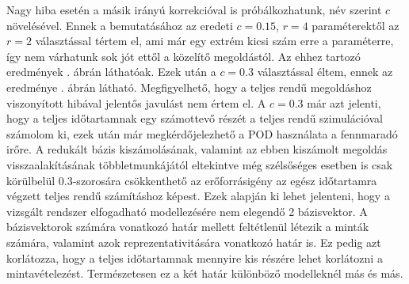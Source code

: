         \par
        Nagy hiba esetén a másik irányú korrekcióval is próbálkozhatunk, név szerint $c$ növelésével. Ennek a bemutatásához az eredeti $c=0.15$, $r=4$ paraméterektől az $r=2$ választással tértem el, ami már egy extrém kicsi szám erre a paraméterre, így nem várhatunk sok jót ettől a közelítő megoldástól. Az ehhez tartozó eredmények . ábrán láthatóak. Ezek után a $c=0.3$ választással éltem, ennek az eredménye . ábrán látható. Megfigyelhető, hogy a teljes rendű megoldáshoz viszonyított hibával jelentős javulást nem értem el. A $c=0.3$ már azt jelenti, hogy a teljes időtartamnak egy számottevő részét a teljes rendű szimulációval számolom ki, ezek után már megkérdőjelezhető a POD használata a fennmaradó irőre. A redukált bázis kiszámolásának, valamint az ebben kiszámolt megoldás visszaalakításának többletmunkájától eltekintve még szélsőséges esetben is csak körülbelül $0.3$-szorosára csökkenthető az erőforrásigény az egész időtartamra végzett teljes rendű számításhoz képest. Ezek alapján ki lehet jelenteni, hogy a vizsgált rendszer elfogadható modellezésére nem elegendő 2 bázisvektor. A bázisvektorok számára vonatkozó határ mellett feltétlenül létezik a minták számára, valamint azok reprezentativitására vonatkozó határ is. Ez pedig azt korlátozza, hogy a teljes időtartamnak mennyire kis részére lehet korlátozni a mintavételezést. Természetesen ez a két határ különböző modelleknél más és más. 
